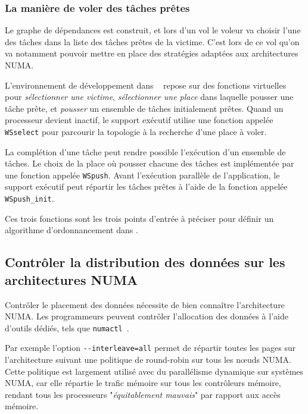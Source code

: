 \documentclass[parallelisme]{compas2016}
\begin{document}
\subsubsection{La manière de voler des tâches prêtes}

Le graphe de dépendances est construit, et lors d'un vol le voleur va choisir
l'une des tâches dans la liste des tâches prêtes de la victime.
C'est lors de ce vol qu'on va notamment pouvoir mettre en place des stratégies
adaptées aux architectures NUMA.

L'environnement de développement dans \kaapi~\cite{Bleuse2014} repose sur des fonctions
virtuelles pour \textit{sélectionner une victime}, \textit{sélectionner une place} dans
laquelle pousser une tâche prête, et \textit{pousser} un ensemble de tâches initialement
prêtes.
Quand un processeur devient inactif, le support exécutif utilise une fonction appelée
\verb/WSselect/ pour parcourir la topologie à la recherche d'une place à voler.

La complétion d'une tâche peut rendre possible l'exécution d'un ensemble de tâches.
Le choix de la place où pousser chacune des tâches est implémentée par une fonction
appelée \verb/WSpush/.
Avant l'exécution parallèle de l'application, le support exécutif peut répartir
les tâches prêtes à l'aide de la fonction appelée \verb/WSpush_init/.

Ces trois fonctions sont les trois points d'entrée à préciser pour définir
un algorithme d'ordonnancement dans \kaapi.


\vspace*{-1ex}
\subsection{Contrôler la distribution des données sur les architectures NUMA}

Contrôler le placement des données nécessite de bien connaître l'architecture NUMA.
Les programmeurs peuvent contrôler l'allocation des données à l'aide d'outils
dédiés, tels que \verb/numactl/~\cite{DBLP:journals/corr/abs-1101-0093}.

Par exemple l'option \verb/--interleave=all/ permet de répartir toutes les pages
sur l'architecture suivant une politique de round-robin sur tous les nœuds NUMA.
Cette politique est largement utilisé avec du parallélisme dynamique sur systèmes
NUMA, car elle répartie le trafic mémoire sur tous les contrôleurs mémoire, rendant
tous les processeurs "\emph{équitablement mauvais}" par rapport aux accès mémoire.
\end{document}
